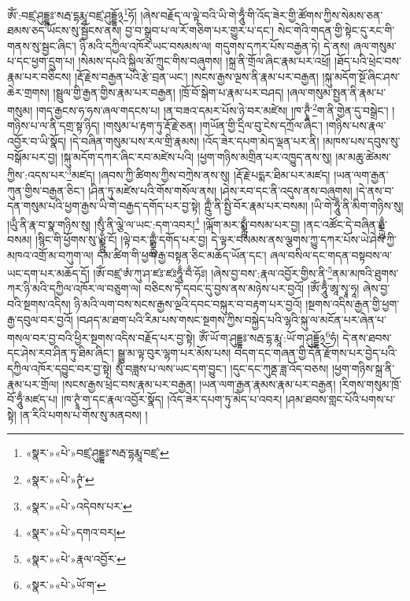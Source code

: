 ཨོཾ་:བཛྲ་ཤུདྡྷཿ་སརྦ་དྷརྨཱ་བཛྲ་ཤུདྡྷོ྅\footnote{«སྣར་»«པེ་»བཛྲ་ཤུདྡྷཿ་སརྦ་དྷརྨཱ་བཛྲ་}ཧོ། །ཞེས་བརྗོད་ལ་ལྟེ་བའི་ཡི་གེ་ཧཱུྃ་གི་འོད་ཟེར་གྱི་ཚོགས་ཀྱིས་སེམས་ཅན་ཐམས་ཅད་ཡོངས་སུ་སྦྱོངས་ནས། བྱ་བ་སྒྲུབ་པ་ལ་རོ་གཅིག་པར་གྱུར་པ་དང་། སེང་གེའི་གདན་གྱི་སྟེང་དུ་རང་གི་གནས་སུ་སྦྱང་ཞིང་། ཉི་མའི་དཀྱིལ་འཁོར་ཡང་བསམས་ལ། གདུགས་དཀར་པོས་བརྒྱན་ཏེ། དེ་ནས། ཞལ་གསུམ་པ་དང་ཕྱག་དྲུག་པ། །སེམས་དཔའི་སྐྱིལ་མོ་ཀྲུང་གིས་བཞུགས། །སྐྲ་ནི་གྲོལ་ཞིང་རྣམ་པར་འཕྲོ། །ཐོད་པའི་ཕྲེང་བས་རྣམ་པར་བཅིངས། །རྡོ་རྗེས་བརྒྱན་པའི་རྩེ་བྲན་ཡང་། །སངས་རྒྱས་ལྔས་ནི་རྣམ་པར་བརྒྱན། །སྐུ་མདོག་སྔོ་ཞིང་ཤས་ཆེར་གྲགས། །སྦྲུལ་གྱི་རྒྱན་གྱིས་རྣམ་པར་བརྒྱན། །ཁྲོ་བོ་སྒེག་པ་རྣམ་པར་བཤད། །ཞལ་གསུམ་སྤྱན་ནི་རྣམ་པ་གསུམ། །གད་རྒྱངས་ཧ་ཧས་ཞལ་གདངས་པ། །ན་བཟའ་དམར་པོས་ཉེ་བར་མཛེས། །ཁ་ཊྭཱྃ་\footnote{«སྣར་»«པེ་»ཊྭཾ་}ག་ནི་གྱེན་དུ་བསྒྲེང་། །གཉིས་པ་ལ་ནི་དགྲ་སྟ་ཉིད། །གསུམ་པ་རྟག་ཏུ་རྡོ་རྗེ་ཅན། །གཡོན་གྱི་དྲིལ་བུ་ངེས་དཀྲོལ་ཞིང་། །གཉིས་པས་རྣལ་འབྱོར་བ་ཡི་སྣོད། །དེ་བཞིན་གསུམ་པས་རལ་གྲི་རྣམས། །འོད་ཟེར་དཔག་མེད་ལྡན་པར་ནི། །མཁས་པས་དབུས་སུ་བསྒོམ་པར་བྱ། །སྐུ་མདོག་དཀར་ཞིང་རབ་མཛེས་པའི། །ཕྱག་གཉིས་མགྲིན་པར་འཁྱུད་ནས་སུ། །མ་མཆུ་ཚེམས་ཀྱིས་:འདས་པར་\footnote{«སྣར་»«པེ་»འདེབས་པར་}མཛད། །ཞབས་ཀྱི་ཚིགས་ཀྱིས་བཀྲེས་ནས་སུ། །རྡོ་རྗེ་པདྨར་ཐིམ་པར་མཛད། །ཡན་ལག་རྒྱན་ཀུན་གྱིས་བརྒྱན་ཅིང་། །ཤིན་ཏུ་མཛེས་པའི་གོས་གསོལ་ནས། །ཤེས་རབ་དང་ནི་འདུས་ནས་བཞུགས། །དེ་ནས་བ་དན་གསུམ་པའི་ཕྱག་རྒྱས་ཡི་གེ་བརྒྱད་དགོད་པར་བྱ་སྟེ། ཀྵུྃ་ནི་སྤྱི་བོར་རྣམ་པར་བསམ། །ཡི་གེ་ཧཱུྃ་ནི་མིག་གཉིས་སུ། །ཡུྃ་ནི་རྣ་བ་སྣ་གཉིས་སུ། །སུྃ་ནི་ལྕེ་ལ་ཡང་:དག་འབར།\footnote{«སྣར་»«པེ་»དགའ་བར།} །ལྐོག་མར་སྨྼྻུྃ་བསམ་པར་བྱ། །ནང་འཚོང་དེ་བཞིན་ཧྨྼྻུྃ་བསམ། །སྙིང་གི་ཕྱོགས་སུ་ཡྨྼྻུྃ་ངོ། །ལྟེ་བར་ཀྵྨྼྻུྃ་དགོད་པར་བྱ། དེ་ལྟར་བསམས་ནས་ལྕགས་ཀྱུ་དཀར་པོས་ཡེ་ཤེས་ཀྱི་མཁའ་འགྲོ་མ་བཀུག་ལ། དམ་ཚིག་གི་ཕྱག་རྒྱ་བསྟན་ཅིང་མཆོད་ཡོན་དང་། ཞལ་བསིལ་དང་གདན་བསྟབས་ལ་ཡང་དག་པར་མཆོད་དོ། །ཨོཾ་བཛྲ་ཨཾ་ཀུ་ཤ་ཛཿ་ཛཿཧཱུྃ་བྃ་ཧོཿ། །ཞེས་བྱ་བས་:རྣལ་འབྱོར་གྱིས་ནི་\footnote{«སྣར་»«པེ་»རྣལ་འབྱོར་}ནམ་མཁའི་ཐུགས་ཀར་ཉི་མའི་དཀྱིལ་འཁོར་ལ་བཅུག་ལ། བཅིངས་ཏེ་དབང་དུ་བྱས་ནས་མཉེས་པར་བྱའོ། །ཨོཾ་ཧཱུྃ་ཨཱ་སྭཱ་ཧཱ། ཞེས་བྱ་བའི་སྔགས་འདིས། ཉི་མའི་ལག་བས་སངས་རྒྱས་ལྔའི་དབང་བསྐུར་བ་བརྟག་པར་བྱའོ། །སྔགས་འདིས་རྒྱན་གྱི་ཕྱག་རྒྱ་དབུལ་བར་བྱའོ། །བཤད་མ་ཐག་པའི་རིམ་པས་གསང་སྔགས་ཀྱིས་བསྐྱེད་པའི་ལྷའི་སྐུ་ལ་མངོན་པར་ཞེན་པ་གསལ་བར་བྱ་བའི་ཕྱིར་སྔགས་འདིས་བརྗོད་པར་བྱ་སྟེ། ཨོཾ་ཡོ་ག་ཤུདྡྷཿ་སརྦ་དྷ་རྨཱ་:ཡོ་ག་ཤུདྡྷོ྅\footnote{«སྣར་»«པེ་»ཡོ་ག་}ཧཾ། དེ་ནས་ཐབས་དང་ཤེས་རབ་ཤིན་ཏུ་ཐིམ་ཞིང་། སྒྱུ་མ་ལྟ་བུར་ལྷག་པར་མོས་པས། བདག་དང་གཞན་གྱི་དོན་རྫོགས་པར་བྱེད་པའི་དཀྱིལ་འཁོར་དབྱུང་བར་བྱ་སྟེ། སུྃ་བཟླས་པ་ལས་ཡང་དག་བྱུང་། །དུང་དང་ཀུནྡ་ཟླ་འོད་བཅས། །ཕྱག་གཉིས་སྐྲ་ནི་རྣམ་པར་གྲོལ། །སངས་རྒྱས་ཕྲེང་བས་རྣམ་པར་བརྒྱན། །ཡན་ལག་རྒྱན་རྣམས་རྣམ་པར་བརྒྱན། །རིགས་གསུམ་ཁྲོ་བོ་ཧཱུྃ་མཛད་པ། །ཁ་ཊྭཱཾ་ག་དང་རྣལ་འབྱོར་སྣོད། །འོད་ཟེར་དཔག་ཏུ་མེད་པ་འབར། །ཤམ་ཐབས་གླང་པོའི་པགས་པ་སྟེ། །ན་རིའི་པགས་པ་གོས་སུ་མནབས། །
